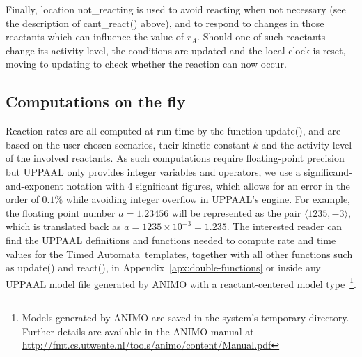 \documentclass{llncs}
\newcommand{\tas}{Timed Automata}
\begin{document}
Finally, location {\sf not\_reacting} is used to avoid reacting when not necessary (see the description
of {\sf cant\_react()} above), and to respond to changes in those reactants
which can influence the value of $r_A$. Should one of such reactants change its activity level, the
conditions are updated and the local clock is reset, moving to {\sf updating} to check whether the reaction can now
occur.

\subsection{Computations on the fly}\label{sec:rates-ta-model}
Reaction rates are all computed at run-time by the function {\sf update()},
and are based on the user-chosen scenarios, their kinetic constant $k$ and the activity level of the involved reactants.
As such computations require floating-point precision but UPPAAL only provides integer
variables and operators, we use a significand-and-exponent notation with 4 significant figures, which allows for an error
in the order of $0.1 \%$ while 
avoiding integer overflow in UPPAAL's engine.
For example, the floating point number $a = 1.23456$ will be represented as the pair $\langle 1235, -3 \rangle$,
which is translated back as $a = 1235 \times 10^{-3} = 1.235$.
The interested reader can find the UPPAAL definitions and functions needed to compute rate and time values for the \tas\ templates,
together with all other functions such as {\sf update()} and {\sf react()},
in Appendix~\ref{apx:double-functions} or 
inside any UPPAAL model file generated by ANIMO with a reactant-centered model type~\footnote{Models generated
by ANIMO are saved in the system's temporary directory. Further details are available in
the ANIMO manual at \url{http://fmt.cs.utwente.nl/tools/animo/content/Manual.pdf}}.
\end{document}
